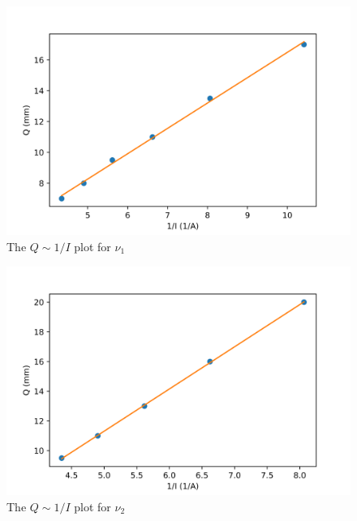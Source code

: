 \documentclass[%
 reprint,
nofootinbib,
 amsmath,amssymb,
 aps,
floatfix,
]{revtex4-2}
\begin{document}
    \begin{figure}
        \centering
        \includegraphics[scale = 0.56]{Figures/plot-1.png}
        \caption{The $Q \sim 1/I$ plot for $\nu_1$}
        \label{fig:plot1}
    \end{figure}
    \begin{figure}
        \centering
        \includegraphics[scale = 0.56]{Figures/plot-2.png}
        \caption{The $Q \sim 1/I$ plot for $\nu_2$}
        \label{fig:plot2}
    \end{figure}
\end{document}
